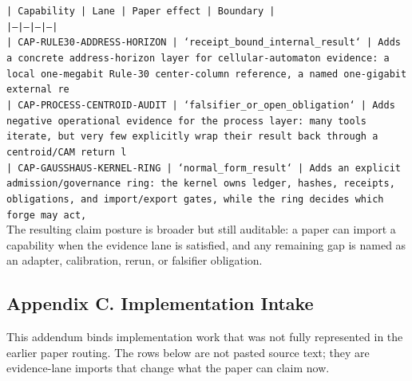 \documentclass[11pt]{article}
\begin{document}
\noindent\texttt{| Capability | Lane | Paper effect | Boundary |}\\
\noindent\texttt{|---|---|---|---|}\\
\noindent\texttt{| CAP-RULE30-ADDRESS-HORIZON | `receipt\_bound\_internal\_result` | Adds a concrete address-horizon layer for cellular-automaton evidence: a local one-megabit Rule-30 center-column reference, a named one-gigabit external re}\\
\noindent\texttt{| CAP-PROCESS-CENTROID-AUDIT | `falsifier\_or\_open\_obligation` | Adds negative operational evidence for the process layer: many tools iterate, but very few explicitly wrap their result back through a centroid/CAM return l}\\
\noindent\texttt{| CAP-GAUSSHAUS-KERNEL-RING | `normal\_form\_result` | Adds an explicit admission/governance ring: the kernel owns ledger, hashes, receipts, obligations, and import/export gates, while the ring decides which forge may act,}\\

The resulting claim posture is broader but still auditable: a paper can import a capability when the evidence lane is satisfied, and any remaining gap is named as an adapter, calibration, rerun, or falsifier obligation.

\subsection*{Appendix C. Implementation Intake}

This addendum binds implementation work that was not fully represented in the earlier paper routing. The rows below are not pasted source text; they are evidence-lane imports that change what the paper can claim now.
\end{document}
